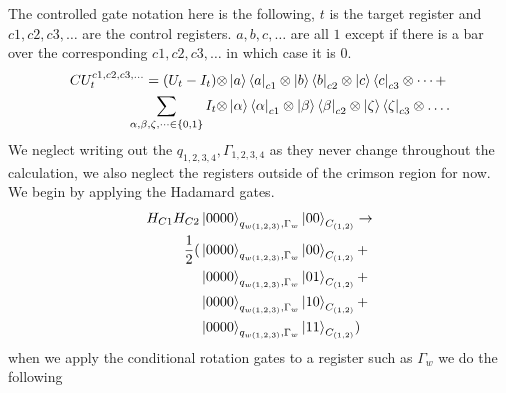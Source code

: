 \documentclass{article}
\begin{document}
The controlled gate notation here is the following, $t$ is the target register and $c1,c2,c3,\dots$ are the control registers. $a,b,c,\dots$ are all $1$ except if there is a bar over the corresponding $c1,c2,c3,\dots$ in which case it is $0$. 
\begin{equation}
    \begin{split}
        CU^{c1,c2,c3,\dots}_t = (U_t-I_t)\otimes &\ket{a}\bra{a}_{c1} \otimes \ket{b}\bra{b}_{c2} \otimes \ket{c}\bra{c}_{c3}\otimes\dots+\\ 
        \sum_{\alpha,\beta,\zeta,\dots\in\{0,1\}}I_t\otimes &\ket{\alpha}\bra{\alpha}_{c1} \otimes \ket{\beta}\bra{\beta}_{c2} \otimes \ket{\zeta}\bra{\zeta}_{c3}\otimes\dots. 
    \end{split}
\end{equation}
We neglect writing out the $q_{1,2,3,4},\Gamma_{1,2,3,4}$ as they never change throughout the calculation, we also neglect the registers outside of the crimson region for now. 
We begin by applying the Hadamard gates.
\begin{equation}
    \begin{split}
        H_{C1}H_{C2}&\ket{0000}_{q_{w(1,2,3)},\Gamma_w}\ket{ 00}_{C_{(1,2)}}\to\\
        \frac{1}{2}(
        &\ket{0000}_{q_{w(1,2,3)},\Gamma_w}\ket{ 00}_{C_{(1,2)}}+\\
        &\ket{0000}_{q_{w(1,2,3)},\Gamma_w}\ket{ 01}_{C_{(1,2)}}+\\
        &\ket{0000}_{q_{w(1,2,3)},\Gamma_w}\ket{ 10}_{C_{(1,2)}}+\\
        &\ket{0000}_{q_{w(1,2,3)},\Gamma_w}\ket{ 11}_{C_{(1,2)}}
        )
    \end{split}
\end{equation}
when we apply the conditional rotation gates to a register such as $\Gamma_w$ we do the following
\end{document}
